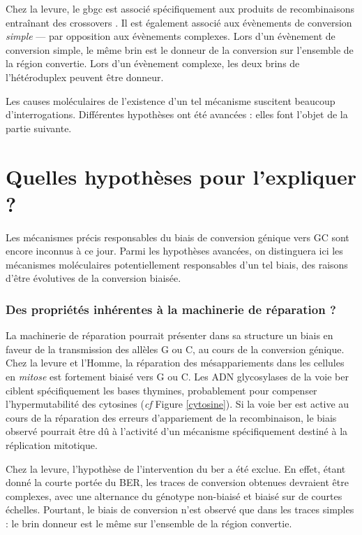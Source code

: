 \documentclass[11pt, oneside]{scrartcl}
\begin{document}
Chez la levure, le \ac{gbgc} est associé spécifiquement aux produits de
recombinaisons entraînant des crossovers \cite{lesecque_gc-biased_2013}. Il est
également associé aux évènements de conversion \emph{simple} --- par opposition aux
évènements complexes. Lors d'un évènement de conversion simple, le même brin est
le donneur de la conversion sur l'ensemble de la région convertie. Lors d'un
évènement complexe, les deux brins de l'hétéroduplex peuvent être donneur. 

\begin{transition}
  Les causes moléculaires de l'existence d'un tel mécanisme suscitent beaucoup
  d'interrogations. Différentes hypothèses ont été avancées : elles font l'objet
  de la partie suivante. 
\end{transition}

\section{Quelles hypothèses pour l'expliquer ?}
\label{sec:orgheadline11}
Les mécanismes précis responsables du biais de conversion génique vers GC sont
encore inconnus à ce jour. Parmi les hypothèses avancées, on distinguera ici les
mécanismes moléculaires potentiellement responsables d'un tel biais, des raisons
d'être évolutives de la conversion biaisée.

\subsubsection*{Des propriétés inhérentes à la machinerie de réparation ?}
\label{sec:orgheadline9}

La machinerie de réparation pourrait présenter dans sa structure un biais en
faveur de la transmission des allèles G ou C, au cours de la conversion génique.
Chez la levure et l'Homme, la réparation des mésappariements dans les cellules
en \emph{mitose} est fortement biaisé vers G ou C. Les ADN glycosylases de la voie
\ac{ber} ciblent spécifiquement les bases thymines, probablement pour compenser
l'hypermutabilité des cytosines\cite{brown_specific_1987} (\emph{cf} Figure
\ref{cytosine}). Si la voie \ac{ber} est active au cours de la réparation des
erreurs d'appariement de la recombinaison, le biais observé pourrait être dû à
l'activité d'un mécanisme spécifiquement destiné à la réplication mitotique.

Chez la levure, l'hypothèse de l'intervention du \ac{ber} a été
exclue\cite{lesecque_gc-biased_2013}. En effet, étant donné la courte portée du
BER, les traces de conversion obtenues devraient être complexes, avec une
alternance du génotype non-biaisé et biaisé sur de courtes échelles. Pourtant,
le biais de conversion n'est observé que dans les traces simples : le brin
donneur est le même sur l'ensemble de la région convertie.
\end{document}
